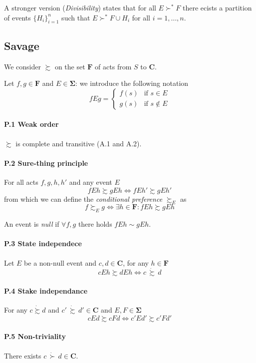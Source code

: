 \documentclass[landscape, 12pt]{extarticle}
\begin{document}
\begin{multicols}{2}
	A stronger version (\textit{Divisibility}) states that for all $E \succ^* F$ there ecists
	a partition of events $\{H_i\}^n_{i = 1}$
	such that $E \succ^* F \cup H_i$ for all $i = 1, \dots, n$.

	\subsection{Savage}
	We consider $\succsim$ on the set $\bm F$ of acts from $S$ to $\bm C$.

	Let $f, g \in \bm F$ and $E \in \bm \Sigma$: we introduce the following notation
	\[
		fEg = \begin{cases}
			f(s) & \text{if } s \in E    \\
			g(s) & \text{if } s \notin E
		\end{cases}
	\]

	\paragraph{P.1 Weak order}
	$\succsim$ is complete and transitive (A.1 and A.2).

	\paragraph{P.2 Sure-thing principle}
	For all acts $f, g, h, h'$ and any event $E$
	\[
		fEh \succsim gEh \iff fEh' \succsim gEh'
	\]
	from which we can define the \textit{conditional preference} $\succsim_E$ as
	\[
		f \succsim_E g \iff \exists h \in \bm F : f E h \succsim gEh
	\]

	An event is \textit{null} if $\forall f, g$ there holds $fEh \sim gEh$.

	\paragraph{P.3 State independece}
	Let $E$ be a non-null event and $c, d \in \bm C$, for any $h \in \bm F$
	\[
		cEh \succsim dEh \iff c\, \dot \succsim \, d
	\]

	\paragraph{P.4 Stake independance}
	For any $c \dot \succsim d$ and $c' \, \dot \succsim \, d' \in \bm C$
	and $E, F \in \bm \Sigma$
	\[
		cEd \succsim cFd \iff c'Ed'\succsim c'Fd'
	\]

	\paragraph{P.5 Non-triviality}
	There exists $c \, \dot \succ \, d \in \bm C$.


\end{multicols}
\end{document}
